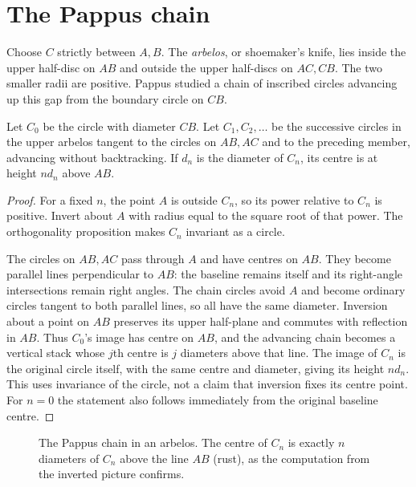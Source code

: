 \section{The Pappus chain}

Choose $C$ strictly between $A,B$. The \emph{arbelos}, or shoemaker's knife, lies inside the upper half-disc on $AB$ and outside the upper half-discs on $AC,CB$. The two smaller radii are positive. Pappus studied a chain of inscribed circles advancing up this gap from the boundary circle on $CB$.

\begin{theorem}[Pappus]\label{geometry:thm:pappus}
Let $C_0$ be the circle with diameter $CB$. Let $C_1,C_2,\ldots$ be the successive circles in the upper arbelos tangent to the circles on $AB,AC$ and to the preceding member, advancing without backtracking. If $d_n$ is the diameter of $C_n$, its centre is at height $n d_n$ above $AB$.
\end{theorem}
\begin{proof}
For a fixed $n$, the point $A$ is outside $C_n$, so its power relative to $C_n$ is positive. Invert about $A$ with radius equal to the square root of that power. The orthogonality proposition makes $C_n$ invariant as a circle.

The circles on $AB,AC$ pass through $A$ and have centres on $AB$. They become parallel lines perpendicular to $AB$: the baseline remains itself and its right-angle intersections remain right angles. The chain circles avoid $A$ and become ordinary circles tangent to both parallel lines, so all have the same diameter. Inversion about a point on $AB$ preserves its upper half-plane and commutes with reflection in $AB$. Thus $C_0$'s image has centre on $AB$, and the advancing chain becomes a vertical stack whose $j$th centre is $j$ diameters above that line. The image of $C_n$ is the original circle itself, with the same centre and diameter, giving its height $nd_n$. This uses invariance of the circle, not a claim that inversion fixes its centre point. For $n=0$ the statement also follows immediately from the original baseline centre.
\end{proof}

\begin{figure}[ht]
\centering
{}
\caption{The Pappus chain in an arbelos. The centre of $C_n$ is exactly $n$ diameters of $C_n$ above the line $AB$ (rust), as the computation
from the inverted picture confirms.}
\label{geometry:fig:pappus}
\end{figure}

